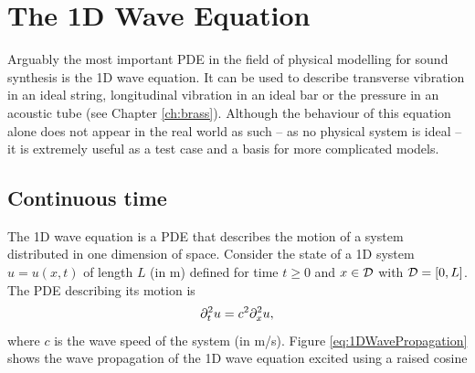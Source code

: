 
    
    
    

\section{%
The 1D Wave Equation}\label{sec:1DWave}
Arguably the most important PDE in the field of physical modelling for sound synthesis is the 1D wave equation. It can be used to describe transverse vibration in an ideal string, longitudinal vibration in an ideal bar or the pressure in an acoustic tube (see Chapter \ref{ch:brass}). Although the behaviour of this equation alone does not appear in the real world as such -- as no physical system is ideal -- it is extremely useful as a test case and a basis for more complicated models. %

\subsection{Continuous time}
The 1D wave equation is a PDE that describes the motion of a system distributed in one dimension of space. Consider the state of a 1D system $u=u(x,t)$ of length $L$ (in m) defined for time $t\geq 0$ and $x\in \mathcal{D}$ with $\mathcal{D} = [0, L]$. The PDE describing its motion is
\begin{equation}\label{eq:1DwavePDE}
    \partial_t^2 u = c^2 \partial_x^2 u,
\end{equation}
where $c$ is the wave speed of the system (in m/s). Figure \ref{eq:1DWavePropagation} shows the wave propagation of the 1D wave equation excited using a raised cosine

